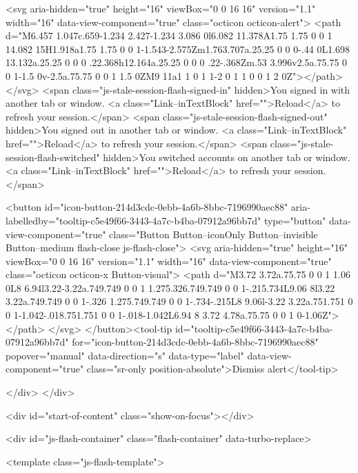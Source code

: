         <svg aria-hidden="true" height="16" viewBox="0 0 16 16" version="1.1" width="16" data-view-component="true" class="octicon octicon-alert">
    <path d="M6.457 1.047c.659-1.234 2.427-1.234 3.086 0l6.082 11.378A1.75 1.75 0 0 1 14.082 15H1.918a1.75 1.75 0 0 1-1.543-2.575Zm1.763.707a.25.25 0 0 0-.44 0L1.698 13.132a.25.25 0 0 0 .22.368h12.164a.25.25 0 0 0 .22-.368Zm.53 3.996v2.5a.75.75 0 0 1-1.5 0v-2.5a.75.75 0 0 1 1.5 0ZM9 11a1 1 0 1 1-2 0 1 1 0 0 1 2 0Z"></path>
</svg>
        <span class="js-stale-session-flash-signed-in" hidden>You signed in with another tab or window. <a class="Link--inTextBlock" href="">Reload</a> to refresh your session.</span>
        <span class="js-stale-session-flash-signed-out" hidden>You signed out in another tab or window. <a class="Link--inTextBlock" href="">Reload</a> to refresh your session.</span>
        <span class="js-stale-session-flash-switched" hidden>You switched accounts on another tab or window. <a class="Link--inTextBlock" href="">Reload</a> to refresh your session.</span>

    <button id="icon-button-214d3cdc-0ebb-4a6b-8bbc-7196990aec88" aria-labelledby="tooltip-c5e49f66-3443-4a7c-b4ba-07912a96bb7d" type="button" data-view-component="true" class="Button Button--iconOnly Button--invisible Button--medium flash-close js-flash-close">  <svg aria-hidden="true" height="16" viewBox="0 0 16 16" version="1.1" width="16" data-view-component="true" class="octicon octicon-x Button-visual">
    <path d="M3.72 3.72a.75.75 0 0 1 1.06 0L8 6.94l3.22-3.22a.749.749 0 0 1 1.275.326.749.749 0 0 1-.215.734L9.06 8l3.22 3.22a.749.749 0 0 1-.326 1.275.749.749 0 0 1-.734-.215L8 9.06l-3.22 3.22a.751.751 0 0 1-1.042-.018.751.751 0 0 1-.018-1.042L6.94 8 3.72 4.78a.75.75 0 0 1 0-1.06Z"></path>
</svg>
</button><tool-tip id="tooltip-c5e49f66-3443-4a7c-b4ba-07912a96bb7d" for="icon-button-214d3cdc-0ebb-4a6b-8bbc-7196990aec88" popover="manual" data-direction="s" data-type="label" data-view-component="true" class="sr-only position-absolute">Dismiss alert</tool-tip>


  
</div>
    </div>

  <div id="start-of-content" class="show-on-focus"></div>








    <div id="js-flash-container" class="flash-container" data-turbo-replace>




  <template class="js-flash-template">
    
